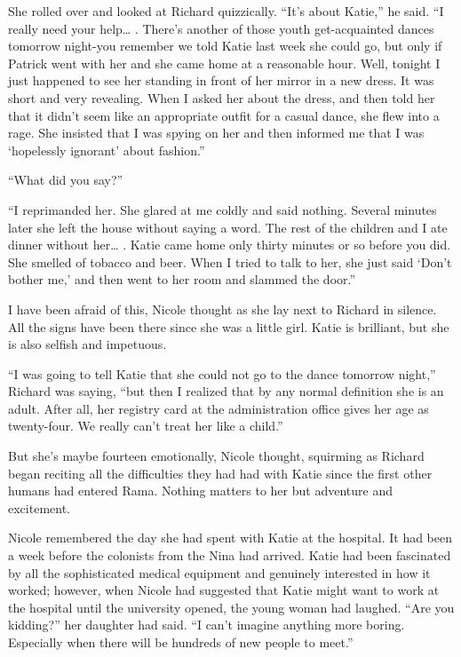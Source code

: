 \documentclass[]{article}
\begin{document}
{She rolled over and looked at Richard quizzically. “It’s about Katie,” he said. “I really need your help… . There’s another of those youth get-acquainted dances tomorrow night-you remember we told Katie last week she could go, but only if Patrick went with her and she came home at a reasonable hour. Well, tonight I just happened to see her standing in front of her mirror in a new dress. It was short and very revealing. When I asked her about the dress, and then told her that it didn’t seem like an appropriate outfit for a casual dance, she flew into a rage. She insisted that I was spying on her and then informed me that I was ‘hopelessly ignorant’ about fashion.”

“What did you say?”

“I reprimanded her. She glared at me coldly and said nothing. Several minutes later she left the house without saying a word. The rest of the children and I ate dinner without her… . Katie came home only thirty minutes or so before you did. She smelled of tobacco and beer. When I tried to talk to her, she just said ‘Don’t bother me,’ and then went to her room and slammed the door.”

I have been afraid of this, Nicole thought as she lay next to Richard in silence. All the signs have been there since she was a little girl. Katie is brilliant, but she is also selfish and impetuous.

“I was going to tell Katie that she could not go to the dance tomorrow night,” Richard was saying, “but then I realized that by any normal definition she is an adult. After all, her registry card at the administration office gives her age as twenty-four. We really can’t treat her like a child.”

But she’s maybe fourteen emotionally, Nicole thought, squirming as Richard began reciting all the difficulties they had had with Katie since the first other humans had entered Rama. Nothing matters to her but adventure and excitement.

Nicole remembered the day she had spent with Katie at the hospital. It had been a week before the colonists from the Nina had arrived. Katie had been fascinated by all the sophisticated medical equipment and genuinely interested in how it worked; however, when Nicole had suggested that Katie might want to work at the hospital until the university opened, the young woman had laughed. “Are you kidding?” her daughter had said. “I can’t imagine anything more boring. Especially when there will be hundreds of new people to meet.”

}
\end{document}
